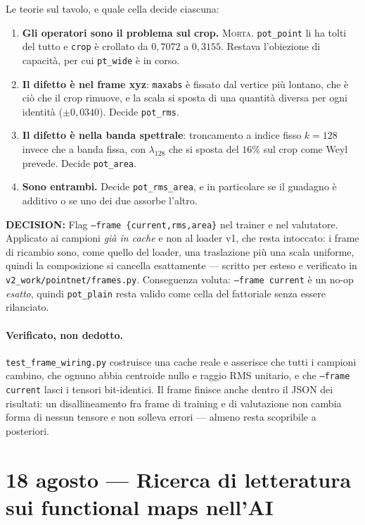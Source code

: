 \documentclass[11pt,a4paper]{article}
\newcommand{\decision}[1]{\textcolor{decision}{\textbf{DECISION:}} #1}
\begin{document}
Le teorie sul tavolo, e quale cella decide ciascuna:

\begin{enumerate}
\item \textbf{Gli operatori sono il problema sul crop.} \textsc{Morta.} \texttt{pot\_point} li
      ha tolti del tutto e \texttt{crop} \`e crollato da $0{,}7072$ a $0{,}3155$. Restava
      l'obiezione di capacit\`a, per cui \texttt{pt\_wide} \`e in corso.
\item \textbf{Il difetto \`e nel frame xyz}: \texttt{maxabs} \`e fissato dal vertice pi\`u
      lontano, che \`e ci\`o che il crop rimuove, e la scala si sposta di una quantit\`a diversa
      per ogni identit\`a ($\pm 0{,}0340$). Decide \texttt{pot\_rms}.
\item \textbf{Il difetto \`e nella banda spettrale}: troncamento a indice fisso $k=128$ invece
      che a banda fissa, con $\lambda_{128}$ che si sposta del $16\%$ sul crop come Weyl
      prevede. Decide \texttt{pot\_area}.
\item \textbf{Sono entrambi.} Decide \texttt{pot\_rms\_area}, e in particolare se il guadagno
      \`e additivo o se uno dei due assorbe l'altro.
\end{enumerate}

\decision{Flag \texttt{--frame \{current,rms,area\}} nel trainer e nel valutatore. Applicato ai
campioni \emph{gi\`a in cache} e non al loader v1, che resta intoccato: i frame di ricambio sono,
come quello del loader, una traslazione pi\`u una scala uniforme, quindi la composizione si
cancella esattamente --- scritto per esteso e verificato in \texttt{v2\_work/pointnet/frames.py}.
Conseguenza voluta: \texttt{--frame current} \`e un no-op \emph{esatto}, quindi \texttt{pot\_plain}
resta valido come cella del fattoriale senza essere rilanciato.}

\paragraph{Verificato, non dedotto.} \texttt{test\_frame\_wiring.py} costruisce una cache reale e
asserisce che tutti i campioni cambino, che ognuno abbia centroide nullo e raggio RMS unitario,
e che \texttt{--frame current} lasci i tensori bit-identici. Il frame finisce anche dentro il
JSON dei risultati: un disallineamento fra frame di training e di valutazione non cambia forma
di nessun tensore e non solleva errori --- almeno resta scopribile a posteriori.


\section{18 agosto --- Ricerca di letteratura sui functional maps nell'AI}
\end{document}
